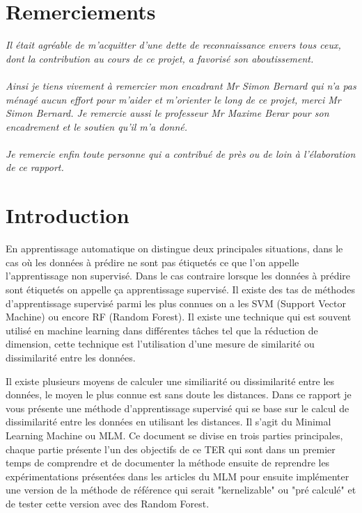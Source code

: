 \documentclass[12pt,a4paper]{report}
\begin{document}
\chapter*{Remerciements}
\par \textit{Il était agréable de m'acquitter d'une dette de reconnaissance envers tous ceux, dont la contribution au cours de ce projet, a favorisé son aboutissement. \\\\
 Ainsi je tiens vivement à remercier mon encadrant Mr Simon Bernard qui n'a pas ménagé aucun effort pour m'aider et m'orienter le long de ce projet, merci Mr Simon Bernard. Je remercie aussi le professeur Mr Maxime Berar pour son  encadrement et le soutien qu'il m'a donné.\\\\
 Je remercie enfin toute personne qui a contribué de près ou de loin à l'élaboration de ce rapport. 
}

\tableofcontents
{\color{MidnightBlue}\chapter{Introduction}}

\par En apprentissage automatique on distingue deux principales situations, dans le cas où les données à prédire ne sont pas étiquetés ce que l'on appelle l'apprentissage non supervisé. Dans le cas contraire lorsque les données à prédire sont étiquetés on appelle ça apprentissage supervisé. Il existe des tas de méthodes d'apprentissage supervisé parmi les plus connues on a les SVM (Support Vector Machine) ou encore RF (Random Forest). Il existe une technique qui est souvent utilisé en machine learning dans différentes tâches tel que la réduction de dimension, cette technique est l'utilisation d'une mesure de similarité ou dissimilarité entre les données.

\par Il existe plusieurs moyens de calculer une similiarité ou dissimilarité entre les données, le moyen le plus connue est sans doute les distances. Dans ce rapport je vous présente une méthode d'apprentissage supervisé qui se base sur le calcul de dissimilarité entre les données en utilisant les distances. Il s'agit du Minimal Learning Machine ou MLM. Ce document se divise en trois parties principales, chaque partie présente l'un des objectifs de ce TER qui sont dans un premier temps de comprendre et de documenter la méthode ensuite de reprendre les expérimentations présentées dans les articles du MLM pour ensuite implémenter une version de la méthode de référence qui serait "kernelizable" ou "pré calculé" et de tester cette version avec des Random Forest. 
\end{document}

